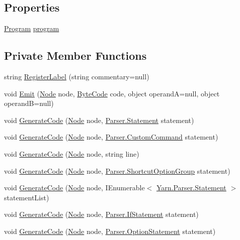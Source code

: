 \subsection*{Properties}
\begin{DoxyCompactItemize}
\item 
\hyperlink{a00081}{Program} \hyperlink{a00043_aa1737da428ec7d597009661dd8a47829}{program}
\end{DoxyCompactItemize}
\subsection*{Private Member Functions}
\begin{DoxyCompactItemize}
\item 
string \hyperlink{a00043_a1bae0d8b701a59708641aa36ea971fa5}{Register\-Label} (string commentary=null)
\item 
void \hyperlink{a00043_a774e8c143cdda0584fcfdda98626a83c}{Emit} (\hyperlink{a00040_a00181}{Node} node, \hyperlink{a00040_ad5dfb6ee68ca7469623ad3e459f98894}{Byte\-Code} code, object operand\-A=null, object operand\-B=null)
\item 
void \hyperlink{a00043_a006f3becd521cc179ba3d3352f6f930b}{Generate\-Code} (\hyperlink{a00040_a00181}{Node} node, \hyperlink{a00090}{Parser.\-Statement} statement)
\item 
void \hyperlink{a00043_a656b6c7fcd08d24300ec592465274f66}{Generate\-Code} (\hyperlink{a00040_a00181}{Node} node, \hyperlink{a00046}{Parser.\-Custom\-Command} statement)
\item 
void \hyperlink{a00043_a860767f3594afeae1c5fe21b7b82cbc6}{Generate\-Code} (\hyperlink{a00040_a00181}{Node} node, string line)
\item 
void \hyperlink{a00043_a3e492edcefdfeacec80e528f8c4fa6cc}{Generate\-Code} (\hyperlink{a00040_a00181}{Node} node, \hyperlink{a00085}{Parser.\-Shortcut\-Option\-Group} statement)
\item 
void \hyperlink{a00043_ab4f6dd2ddf38b0c5bfb2b8a40869a09a}{Generate\-Code} (\hyperlink{a00040_a00181}{Node} node, I\-Enumerable$<$ \hyperlink{a00090}{Yarn.\-Parser.\-Statement} $>$ statement\-List)
\item 
void \hyperlink{a00043_a6ab14514a3b0644ae39c626e5e5e180d}{Generate\-Code} (\hyperlink{a00040_a00181}{Node} node, \hyperlink{a00057}{Parser.\-If\-Statement} statement)
\item 
void \hyperlink{a00043_a5cb3cbcd9727bdef018ec5299bd13142}{Generate\-Code} (\hyperlink{a00040_a00181}{Node} node, \hyperlink{a00075}{Parser.\-Option\-Statement} statement)

\end{DoxyCompactItemize}
